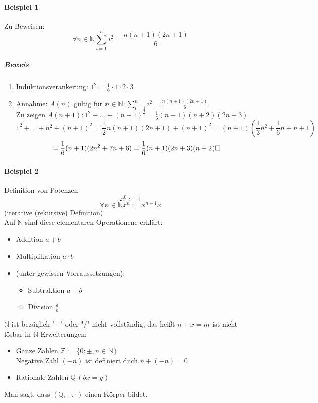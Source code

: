 \documentclass[a4paper]{scrartcl}
\DeclareMathOperator{\Forall}{\forall}%
\begin{document}
\paragraph{Beispiel 1}
\label{sec-2-4-2-3}
Zu Beweisen: \[\Forall n\in\mathbb{N} \sum_{i = 1}^n i^2 = \frac{n(n+1)(2n+1)}{6}\]
\subparagraph{Beweis}
\label{sec-2-4-2-3-1}
\begin{enumerate}
\item Induktionsverankerung: $1^2 = \frac{1}{6}\cdot 1\cdot 2\cdot 3$
\item Annahme: $A(n)$ gültig für $n\in\mathbb{N}: \sum_{i = 1}^n i^2 = \frac{n(n+1)(2n+1)}{6}$ \\
         Zu zeigen $A(n + 1): 1^2 + \ldots + (n+1)^2 = \frac{1}{6} (n+1)(n+2)(2n+3)$
         \[1^2 + \ldots + n^2 + (n+1)^2 = \frac{1}{2} n(n+1)(2n+1) + (n+1)^2 = (n+1)(\frac{1}{3}n^2 + \frac{1}{6}n + n + 1)\]
         \[= \frac{1}{6}(n+1)(2n^2+7n+6) = \frac{1}{6}(n+1)(2n+3)(n+2)\hfill\square\]
\end{enumerate}
\paragraph{Beispiel 2}
\label{sec-2-4-2-4}
Definition von Potenzen
\[x^0 := 1\]
\[\Forall n\in\mathbb{N} x^n := x^{n - 1}x\]
(iterative (rekursive) Definition) \\
     Auf $\mathbb{N}$ sind diese elementaren Operationene erklärt:
\begin{itemize}
\item Addition $a+b$
\item Multiplikation $a\cdot b$
\item (unter gewissen Vorraussetzungen):
\begin{itemize}
\item Subtraktion $a-b$
\item Division $\frac{a}{b}$
\end{itemize}
\end{itemize}
$\mathbb{N}$ ist bezüglich "$-$" oder "$/$" nicht vollständig, das heißt $n+x = m$ ist nicht lösbar in $\mathbb{N}$
Erweiterungen:
\begin{itemize}
\item Ganze Zahlen $\mathbb{Z}:=\{0; \pm, n\in\mathbb{N}\}$ \\
       Negative Zahl $(-n)$ ist definiert duch $n+(-n) = 0$
\item Rationale Zahlen $\mathbb{Q}~(b x = y)$
\end{itemize}
Man sagt, dass $(\mathbb{Q},+,\cdot)$ einen Körper bildet.
\end{document}
